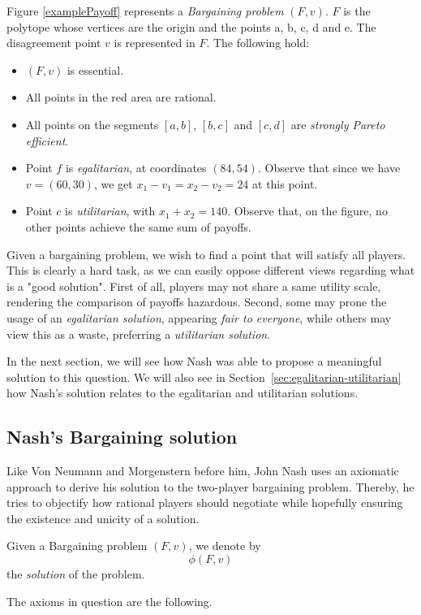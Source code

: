 \begin{example}
\label{example2Barg}
 Figure \ref{examplePayoff} represents a \emph{Bargaining problem} $(F,v)$.   $F$ is the polytope whose vertices are the origin and the points a, b, c, d and e.  The disagreement point $v$ is represented in $F$.
The following hold:
\begin{itemize}
\item $(F,v)$ is essential.
\item All points in the red area are rational.
\item All points on the segments $[a,b]$, $[b,c]$ and $[c,d]$ are \emph{strongly Pareto efficient}.
\item Point $f$ is \emph{egalitarian}, at coordinates $(84,54)$. Observe that since we have $v = (60,30)$, we get $x_1 - v_1 = x_2 - v_2 = 24$ at this point.
\item Point $c$ is \emph{utilitarian}, with $x_1 + x_2 = 140$. Observe that, on the figure, no other points achieve the same  sum of payoffs.
\end{itemize}
\end{example}


Given a bargaining problem, we wish to find a point that will satisfy all players.
This is clearly a hard task, as we can easily oppose different views regarding what is a "good solution".
First of all, players may not share a same utility scale, rendering the comparison of payoffs hazardous.
Second, some may prone the usage of an \emph{egalitarian solution}, appearing \emph{fair to everyone}, while others may view this as a waste, preferring a \emph{utilitarian solution}.

In the next section, we will see how Nash was able to propose a meaningful solution to this question. We will also see in Section~\ref{sec:egalitarian-utilitarian} how Nash's solution relates to the egalitarian and utilitarian solutions.



\subsection{Nash's Bargaining solution}



Like Von Neumann and Morgenstern before him, John Nash uses an axiomatic approach to derive his solution to the two-player bargaining problem. Thereby, he tries to objectify how rational players should negotiate while hopefully ensuring the existence and unicity of a solution.
\begin{notation}
Given a Bargaining problem $(F,v)$, we denote by
$$ \phi(F,v) $$
the \emph{solution} of the problem.
\end{notation}
 The axioms in question are the following.

